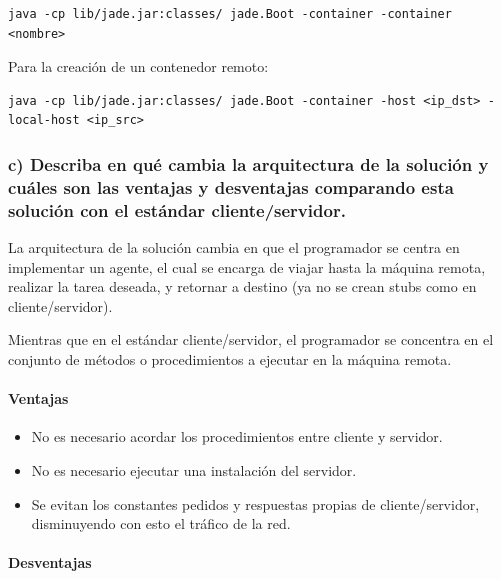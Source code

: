 \documentclass[11pt]{article}
\providecommand{\tightlist}{%
      \setlength{\itemsep}{0pt}\setlength{\parskip}{0pt}}
\begin{document}
\begin{verbatim}
java -cp lib/jade.jar:classes/ jade.Boot -container -container <nombre>
\end{verbatim}

Para la creación de un contenedor remoto:

\begin{verbatim}
java -cp lib/jade.jar:classes/ jade.Boot -container -host <ip_dst> -local-host <ip_src>
\end{verbatim}

    \hypertarget{c-describa-en-quuxe9-cambia-la-arquitectura-de-la-soluciuxf3n-y-cuuxe1les-son-las-ventajas-y-desventajas-comparando-esta-soluciuxf3n-con-el-estuxe1ndar-clienteservidor.}{%
\subsubsection{c) Describa en qué cambia la arquitectura de la solución
y cuáles son las ventajas y desventajas comparando esta solución con el
estándar
cliente/servidor.}\label{c-describa-en-quuxe9-cambia-la-arquitectura-de-la-soluciuxf3n-y-cuuxe1les-son-las-ventajas-y-desventajas-comparando-esta-soluciuxf3n-con-el-estuxe1ndar-clienteservidor.}}

    La arquitectura de la solución cambia en que el programador se centra en
implementar un agente, el cual se encarga de viajar hasta la máquina
remota, realizar la tarea deseada, y retornar a destino (ya no se crean
stubs como en cliente/servidor).

Mientras que en el estándar cliente/servidor, el programador se
concentra en el conjunto de métodos o procedimientos a ejecutar en la
máquina remota.

\hypertarget{ventajas}{%
\paragraph{Ventajas}\label{ventajas}}

\begin{itemize}
\tightlist
\item
  No es necesario acordar los procedimientos entre cliente y servidor.
\item
  No es necesario ejecutar una instalación del servidor.
\item
  Se evitan los constantes pedidos y respuestas propias de
  cliente/servidor, disminuyendo con esto el tráfico de la red.
\end{itemize}

\hypertarget{desventajas}{%
\paragraph{Desventajas}\label{desventajas}}
\end{document}
